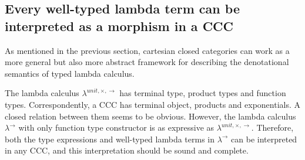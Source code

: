 \clearpage
\subsection{Every well-typed lambda term can be interpreted as a morphism in a CCC}
\label{sec:co_t2m}
As mentioned in the previous section, cartesian closed categories can work as a more general but also more abstract framework for describing the denotational semantics of typed lambda calculus.

The lambda calculus $ \lambda ^{unit, \times , \to } $ has terminal type, product types and function types. Correspondently, a CCC has terminal object, products and exponentials. A closed relation
between them seems to be obvious. However, the lambda calculus $ \lambda ^ \to $ with only function type constructor is as expressive as $ \lambda ^{unit, \times , \to } $. Therefore, both the type expressions and well-typed lambda terms in $ \lambda ^ \to $ can be interpreted in any CCC, and this interpretation should be sound and complete.
